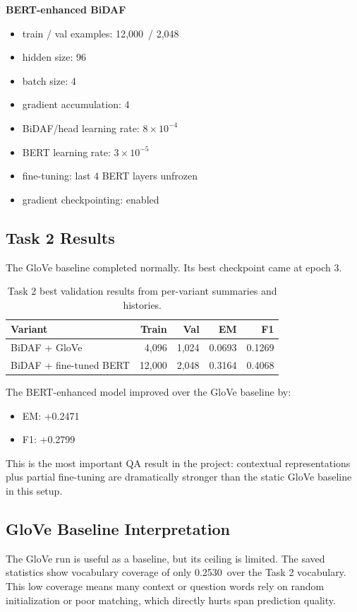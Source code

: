 \documentclass[11pt]{article}
\newcommand{\gloveTrain}{4{,}096}
\newcommand{\gloveVal}{1{,}024}
\newcommand{\gloveBestEpoch}{3}
\newcommand{\gloveEM}{0.0693}
\newcommand{\gloveFOne}{0.1269}
\newcommand{\gloveCoverage}{0.2530}
\newcommand{\bertTrain}{12{,}000}
\newcommand{\bertVal}{2{,}048}
\newcommand{\bertEM}{0.3164}
\newcommand{\bertFOne}{0.4068}
\newcommand{\bertDeltaEM}{+0.2471}
\newcommand{\bertDeltaFOne}{+0.2799}
\begin{document}
\textbf{BERT-enhanced BiDAF}
\begin{itemize}
    \item train / val examples: \bertTrain\ / \bertVal
    \item hidden size: 96
    \item batch size: 4
    \item gradient accumulation: 4
    \item BiDAF/head learning rate: \(8 \times 10^{-4}\)
    \item BERT learning rate: \(3 \times 10^{-5}\)
    \item fine-tuning: last 4 BERT layers unfrozen
    \item gradient checkpointing: enabled
\end{itemize}

\subsection{Task 2 Results}
The GloVe baseline completed normally. Its best checkpoint came at epoch \gloveBestEpoch.

\begin{table}[H]
\centering
\begin{tabular}{lrrrr}
\toprule
\textbf{Variant} & \textbf{Train} & \textbf{Val} & \textbf{EM} & \textbf{F1} \\
\midrule
BiDAF + GloVe & \gloveTrain & \gloveVal & \gloveEM & \gloveFOne \\
BiDAF + fine-tuned BERT & \bertTrain & \bertVal & \bertEM & \bertFOne \\
\bottomrule
\end{tabular}
\caption{Task 2 best validation results from per-variant summaries and histories.}
\label{tab:task2-results}
\end{table}

The BERT-enhanced model improved over the GloVe baseline by:
\begin{itemize}
    \item EM: \bertDeltaEM
    \item F1: \bertDeltaFOne
\end{itemize}

This is the most important QA result in the project: contextual representations plus partial fine-tuning are dramatically stronger than the static GloVe baseline in this setup.

\subsection{GloVe Baseline Interpretation}
The GloVe run is useful as a baseline, but its ceiling is limited. The saved statistics show vocabulary coverage of only \gloveCoverage\ over the Task 2 vocabulary. This low coverage means many context or question words rely on random initialization or poor matching, which directly hurts span prediction quality.
\end{document}

